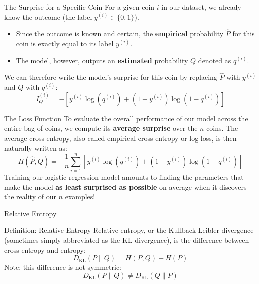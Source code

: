 \begin{frame}{The Surprise for a Specific Coin}
	For a given coin $i$ in our dataset, we already know the outcome (the label $y^{(i)} \in \{0, 1\}$).
	\pause
	\begin{itemize}
		\item Since the outcome is known and certain, the \textbf{empirical} probability $\hat{P}$ for this coin is exactly equal to its label $y^{(i)}$.
		\item The model, however, outputs an \textbf{estimated} probability $Q$ denoted as $q^{(i)}$.
	\end{itemize}
	\pause
	\vspace{0.3cm}
	We can therefore write the model's surprise for this coin by replacing $\hat{P}$ with $y^{(i)}$ and $Q$ with $q^{(i)}$:
	\begin{equation*}
		I_Q^{(i)} = - \left[ y^{(i)} \log(q^{(i)}) + (1 - y^{(i)}) \log(1 - q^{(i)}) \right]
	\end{equation*}
\end{frame}

\begin{frame}{The Loss Function}
	To evaluate the overall performance of our model across the entire bag of coins, we compute its \textbf{average surprise} over the $n$ coins.
	\pause
	The average cross-entropy, also called empirical cross-entropy or log-loss, is then naturally written as:
	\begin{equation*}
		H(\hat{P}, Q) 
		= - \frac{1}{n} \sum_{i=1}^n \left[ y^{(i)} \log{\left(q^{(i)}\right)} + (1 - y^{(i)}) \log{\left(1 - q^{(i)}\right)} \right]
	\end{equation*}
	\pause
	Training our logistic regression model amounts to finding the parameters that make the model \textbf{as least surprised as possible} on average when it discovers the reality of our $n$ examples!
\end{frame}

\begin{frame}{Relative Entropy}
	\begin{block}{Definition: Relative Entropy}
		Relative entropy, or the Kullback-Leibler divergence (sometimes simply abbreviated as the KL divergence), is the difference between cross-entropy and entropy:
		\begin{equation*}
			D_{\text{KL}}(P \parallel Q) = H(P,Q) - H(P)
		\end{equation*}
		Note: this difference is not symmetric:
		\begin{equation*}
			D_{\text{KL}}(P \parallel Q) \ne D_{\text{KL}}(Q \parallel P)
		\end{equation*}
	\end{block}
\end{frame}

